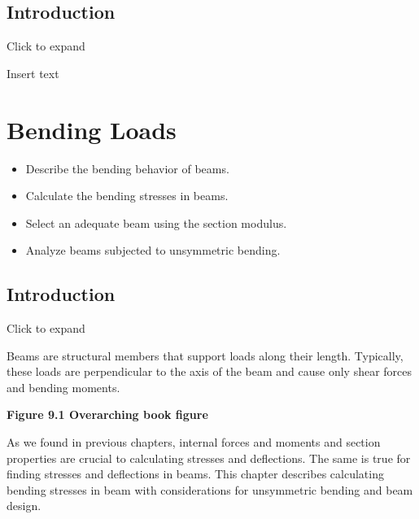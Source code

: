\documentclass[
  letterpaper,
  DIV=11,
  numbers=noendperiod]{scrreprt}
\providecommand{\tightlist}{%
  \setlength{\itemsep}{0pt}\setlength{\parskip}{0pt}}\usepackage{longtable,booktabs,array}
\begin{document}
\section{Introduction}\label{introduction-8}

Click to expand

Insert text


\chapter{Bending Loads}\label{sec-bending-loads}

\begin{tcolorbox}[enhanced jigsaw, colbacktitle=quarto-callout-note-color!10!white, title={Learning Objectives}, coltitle=black, leftrule=.75mm, rightrule=.15mm, opacityback=0, breakable, colframe=quarto-callout-note-color-frame, left=2mm, arc=.35mm, colback=white, bottomrule=.15mm, bottomtitle=1mm, toptitle=1mm, titlerule=0mm, opacitybacktitle=0.6, toprule=.15mm]

\begin{itemize}
\tightlist
\item
  Describe the bending behavior of beams.
\item
  Calculate the bending stresses in beams.
\item
  Select an adequate beam using the section modulus.
\item
  Analyze beams subjected to unsymmetric bending.
\end{itemize}

\end{tcolorbox}

\section*{Introduction}\label{introduction-9}


Click to expand

Beams are structural members that support loads along their length.
Typically, these loads are perpendicular to the axis of the beam and
cause only shear forces and bending moments.

\textbf{Figure 9.1 Overarching book figure} \,

As we found in previous chapters, internal forces and moments and
section properties are crucial to calculating stresses and deflections.
The same is true for finding stresses and deflections in beams. This
chapter describes calculating bending stresses in beam with
considerations for unsymmetric bending and beam design.
\end{document}

